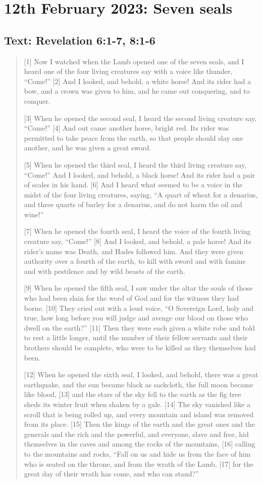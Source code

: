 \section{12th February 2023: Seven seals}
\subsection*{Text: Revelation 6:1-7, 8:1-6}
  \begin{quote}
  [1] Now I watched when the Lamb opened one of the seven seals, and I heard
  one of the four living creatures say with a voice like thunder, “Come!” [2]
  And I looked, and behold, a white horse!  And its rider had a bow, and a
  crown was given to him, and he came out conquering, and to conquer.

  [3] When he opened the second seal, I heard the second living creature say,
  “Come!” [4] And out came another horse, bright red.  Its rider was
  permitted to take peace from the earth, so that people should slay one
  another, and he was given a great sword.

  [5] When he opened the third seal, I heard the third living creature say,
  “Come!” And I looked, and behold, a black horse!  And its rider had a pair
  of scales in his hand.  [6] And I heard what seemed to be a voice in the
  midst of the four living creatures, saying, “A quart of wheat for a
  denarius, and three quarts of barley for a denarius, and do not harm the
  oil and wine!”

  [7] When he opened the fourth seal, I heard the voice of the fourth living
  creature say, “Come!” [8] And I looked, and behold, a pale horse!  And its
  rider’s name was Death, and Hades followed him.  And they were given
  authority over a fourth of the earth, to kill with sword and with famine
  and with pestilence and by wild beasts of the earth.

  [9] When he opened the fifth seal, I saw under the altar the souls of those
  who had been slain for the word of God and for the witness they had borne.
  [10] They cried out with a loud voice, “O Sovereign Lord, holy and true,
  how long before you will judge and avenge our blood on those who dwell on
  the earth?” [11] Then they were each given a white robe and told to rest a
  little longer, until the number of their fellow servants and their brothers
  should be complete, who were to be killed as they themselves had been.

  [12] When he opened the sixth seal, I looked, and behold, there was a great
  earthquake, and the sun became black as sackcloth, the full moon became
  like blood, [13] and the stars of the sky fell to the earth as the fig tree
  sheds its winter fruit when shaken by a gale.  [14] The sky vanished like a
  scroll that is being rolled up, and every mountain and island was removed
  from its place.  [15] Then the kings of the earth and the great ones and
  the generals and the rich and the powerful, and everyone, slave and free,
  hid themselves in the caves and among the rocks of the mountains, [16]
  calling to the mountains and rocks, “Fall on us and hide us from the face
  of him who is seated on the throne, and from the wrath of the Lamb, [17]
  for the great day of their wrath has come, and who can stand?”


\end{quote}
